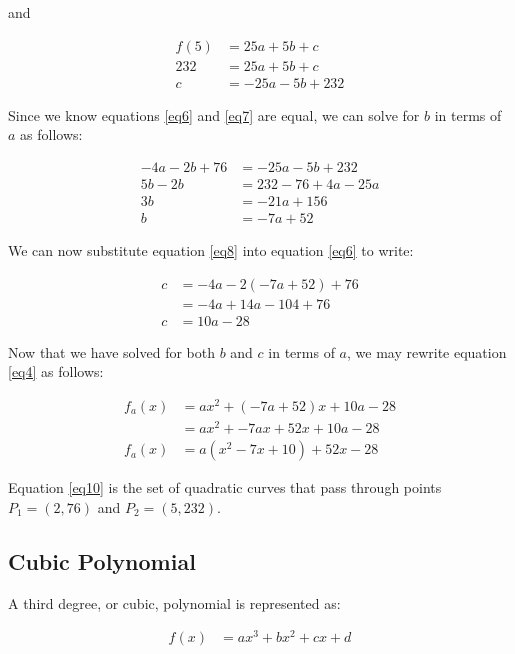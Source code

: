 \documentclass[preview,border=3mm]{article}
\begin{document}
\noindent
and

\begin{align}
    f(5) &= 25a + 5b + c \nonumber \\
    232  &= 25a + 5b + c \nonumber \\
    c    &= -25a - 5b + 232 \label{eq7}
\end{align}

\noindent
Since we know equations \ref{eq6} and \ref{eq7} are equal, we can solve for $b$
in terms of $a$ as follows:

\begin{align}
    -4a - 2b + 76 &= -25a - 5b + 232 \nonumber \\
    5b - 2b       &= 232 - 76 + 4a - 25a \nonumber \\
    3b            &= -21a + 156 \nonumber\\
    b             &= -7a + 52 \label{eq8}
\end{align}

\noindent
We can now substitute equation \ref{eq8} into equation \ref{eq6} to write:

\begin{align}
    c &= -4a - 2(-7a + 52) + 76 \nonumber \\
      &= -4a + 14a - 104 + 76 \nonumber \\
    c &= 10a - 28 \label{eq9}
\end{align}

\noindent
Now that we have solved for both $b$ and $c$ in terms of $a$, we may rewrite
equation \ref{eq4} as follows:

\begin{align}
    f_a(x) &= ax^2 + (-7a + 52)x + 10a - 28 \nonumber \\
           &= ax^2 + -7ax + 52x + 10a - 28 \nonumber \\
    f_a(x) &= a(x^2 - 7x + 10) + 52x - 28 \label{eq10}
\end{align}

\noindent
Equation \ref{eq10} is the set of quadratic curves that pass through points
$P_1 = (2, 76)$ and $P_2 = (5, 232)$.


\subsection{Cubic Polynomial}

\noindent
A third degree, or cubic, polynomial is represented as:

\begin{align}
    f(x) &= ax^3 + bx^2 + cx + d \label{eq11}
\end{align}
\end{document}
